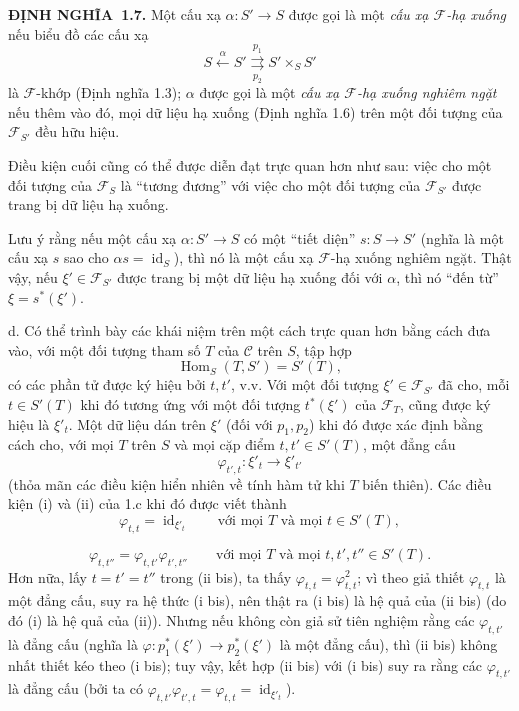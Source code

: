 \documentclass[11pt,twoside,openany]{book}
\numberwithin{equation}{section}
\newcommand{\src}[1]{%
  \phantomsection\hypertarget{src:\fgasourceid:#1}{}%
  \marginpar{\raggedleft\footnotesize\sffamily #1}%
}
\newcommand{\fgasourceid}{unset}
\newcommand{\result}[2]{\par\medskip\noindent\textbf{#1\if\relax\detokenize{#2}\relax\else\ #2\fi.}\quad}
\begin{document}
\result{ĐỊNH NGHĨA}{1.7} Một cấu xạ $\alpha:S'\longrightarrow S$ được gọi là
một \emph{cấu xạ $\mathcal F$-hạ xuống} nếu biểu đồ các cấu xạ
\[
  S\xleftarrow{\alpha}S'
  \overset{p_1}{\underset{p_2}{\rightrightarrows}}S'\times_S S'
\]
là $\mathcal F$-khớp (Định nghĩa 1.3); $\alpha$ được gọi là một
\emph{cấu xạ $\mathcal F$-hạ xuống nghiêm ngặt} nếu thêm vào đó, mọi dữ liệu hạ
xuống (Định nghĩa 1.6) trên một đối tượng của $\mathcal F_{S'}$ đều hữu hiệu.

Điều kiện cuối cũng có thể được diễn đạt trực quan hơn như sau: việc cho một
đối tượng của $\mathcal F_S$ là ``tương đương'' với việc cho một đối tượng của
$\mathcal F_{S'}$ được trang bị dữ liệu hạ xuống.

Lưu ý rằng nếu một cấu xạ $\alpha:S'\longrightarrow S$ có một ``tiết diện''
$s:S\longrightarrow S'$ (nghĩa là một cấu xạ $s$ sao cho
$\alpha s=\operatorname{id}_S$), thì nó là một cấu xạ
$\mathcal F$-hạ xuống nghiêm ngặt. Thật vậy, nếu
$\xi'\in\mathcal F_{S'}$ được trang bị một dữ liệu hạ xuống đối với $\alpha$,
thì nó ``đến từ'' $\xi=s^*(\xi')$.

\medskip\noindent
d. Có thể trình bày các khái niệm trên một cách trực quan hơn bằng cách đưa vào,
với một đối tượng tham số $T$ của $\mathcal C$ trên $S$, tập hợp
\[
  \operatorname{Hom}_S(T,S')=S'(T),
\]
có các phần tử được ký hiệu bởi $t,t'$, v.v. Với một đối tượng
$\xi'\in\mathcal F_{S'}$ đã cho, mỗi $t\in S'(T)$ khi đó tương ứng với một đối
tượng $t^*(\xi')$ của $\mathcal F_T$, cũng được ký hiệu là $\xi'_t$. Một dữ
liệu dán trên $\xi'$ (đối với $p_1,p_2$) khi đó được xác định bằng cách cho,
với mọi $T$ trên $S$ và mọi cặp điểm $t,t'\in S'(T)$, một đẳng cấu
\[
  \varphi_{t',t}:\xi'_t\longrightarrow\xi'_{t'}
\]
(thỏa mãn các điều kiện hiển nhiên về tính hàm tử khi $T$ biến thiên). Các điều
kiện (i) và (ii) của 1.c khi đó được viết thành
\[
  \tag{i bis}
  \varphi_{t,t}=\operatorname{id}_{\xi'_t}
  \qquad\text{với mọi $T$ và mọi $t\in S'(T)$},
\]

\src{304}
\[
  \tag{ii bis}
  \varphi_{t,t''}=\varphi_{t,t'}\varphi_{t',t''}
  \qquad\text{với mọi $T$ và mọi $t,t',t''\in S'(T)$}.
\]
Hơn nữa, lấy $t=t'=t''$ trong (ii bis), ta thấy
$\varphi_{t,t}=\varphi_{t,t}^2$; vì theo giả thiết $\varphi_{t,t}$ là một đẳng
cấu, suy ra hệ thức (i bis), nên thật ra (i bis) là hệ quả của (ii bis) (do đó
(i) là hệ quả của (ii)). Nhưng nếu không còn giả sử tiên nghiệm rằng các
$\varphi_{t,t'}$ là đẳng cấu (nghĩa là
$\varphi:p_1^*(\xi')\longrightarrow p_2^*(\xi')$ là một đẳng cấu), thì (ii bis)
không nhất thiết kéo theo (i bis); tuy vậy, kết hợp (ii bis) với (i bis) suy ra
rằng các $\varphi_{t,t'}$ là đẳng cấu (bởi ta có
$\varphi_{t,t'}\varphi_{t',t}=\varphi_{t,t}=\operatorname{id}_{\xi'_t}$).
\end{document}

